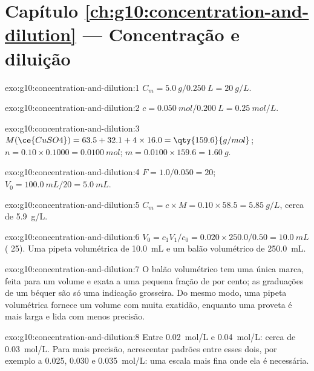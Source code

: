\section*{Capítulo \ref{ch:g10:concentration-and-dilution} --- Concentração e diluição}

\begin{solution}{exo:g10:concentration-and-dilution:1}
$C_m = \qty{5.0}{g} / \qty{0.250}{L} = \qty{20}{g/L}$.
\end{solution}

\begin{solution}{exo:g10:concentration-and-dilution:2}
$c = \qty{0.050}{mol} / \qty{0.200}{L} = \qty{0.25}{mol/L}$.
\end{solution}

\begin{solution}{exo:g10:concentration-and-dilution:3}
$M(\ce{CuSO4}) = 63.5 + 32.1 + 4 \times 16.0 = \qty{159.6}{g/mol}$;
$n = 0.10 \times 0.1000 = \qty{0.0100}{mol}$; $m = 0.0100 \times 159.6 =
\qty{1.60}{g}$.
\end{solution}

\begin{solution}{exo:g10:concentration-and-dilution:4}
$F = 1.0 / 0.050 = 20$; $V_0 = \qty{100.0}{mL} / 20 = \qty{5.0}{mL}$.
\end{solution}

\begin{solution}{exo:g10:concentration-and-dilution:5}
$C_m = c \times M = 0.10 \times 58.5 = \qty{5.85}{g/L}$, cerca de
\qty{5.9}{g/L}.
\end{solution}

\begin{solution}{exo:g10:concentration-and-dilution:6}
$V_0 = c_1 V_1 / c_0 = 0.020 \times 250.0 / 0.50 = \qty{10.0}{mL}$
( 25). Uma pipeta volumétrica de \qty{10.0}{mL} e um
balão volumétrico de \qty{250.0}{mL}.
\end{solution}

\begin{solution}{exo:g10:concentration-and-dilution:7}
O balão volumétrico tem uma única marca, feita para um volume e exata a
uma pequena fração de por cento; as graduações de um béquer são só uma
indicação grosseira. Do mesmo modo, uma pipeta volumétrica fornece um
volume com muita exatidão, enquanto uma proveta é mais larga e lida com
menos precisão.
\end{solution}

\begin{solution}{exo:g10:concentration-and-dilution:8}
Entre \qty{0.02}{mol/L} e \qty{0.04}{mol/L}: cerca de \qty{0.03}{mol/L}.
Para mais precisão, acrescentar padrões entre esses dois, por exemplo a
0.025, 0.030 e \qty{0.035}{mol/L}: uma escala mais fina onde ela é
necessária.
\end{solution}

